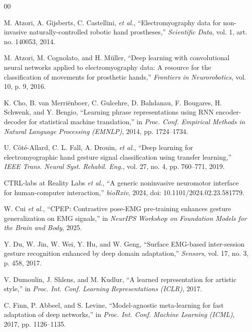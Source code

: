 \documentclass[conference]{IEEEtran}
\begin{document}
\begin{thebibliography}{00}

M. Atzori, A. Gijsberts, C. Castellini, \emph{et al.}, ``Electromyography data for non-invasive naturally-controlled robotic hand prostheses,'' \emph{Scientific Data}, vol. 1, art. no. 140053, 2014.

M. Atzori, M. Cognolato, and H. M\"uller, ``Deep learning with convolutional neural networks applied to electromyography data: A resource for the classification of movements for prosthetic hands,'' \emph{Frontiers in Neurorobotics}, vol. 10, p. 9, 2016.

K. Cho, B. van Merri\"enboer, C. Gulcehre, D. Bahdanau, F. Bougares, H. Schwenk, and Y. Bengio, ``Learning phrase representations using RNN encoder-decoder for statistical machine translation,'' in \emph{Proc. Conf. Empirical Methods in Natural Language Processing (EMNLP)}, 2014, pp. 1724--1734.

U. C\^ot\'e-Allard, C. L. Fall, A. Drouin, \emph{et al.}, ``Deep learning for electromyographic hand gesture signal classification using transfer learning,'' \emph{IEEE Trans. Neural Syst. Rehabil. Eng.}, vol. 27, no. 4, pp. 760--771, 2019.

CTRL-labs at Reality Labs \emph{et al.}, ``A generic noninvasive neuromotor interface for human-computer interaction,'' \emph{bioRxiv}, 2024, doi: 10.1101/2024.02.23.581779.

W. Cui \emph{et al.}, ``CPEP: Contrastive pose-EMG pre-training enhances gesture generalization on EMG signals,'' in \emph{NeurIPS Workshop on Foundation Models for the Brain and Body}, 2025.

Y. Du, W. Jin, W. Wei, Y. Hu, and W. Geng, ``Surface EMG-based inter-session gesture recognition enhanced by deep domain adaptation,'' \emph{Sensors}, vol. 17, no. 3, p. 458, 2017.

V. Dumoulin, J. Shlens, and M. Kudlur, ``A learned representation for artistic style,'' in \emph{Proc. Int. Conf. Learning Representations (ICLR)}, 2017.

C. Finn, P. Abbeel, and S. Levine, ``Model-agnostic meta-learning for fast adaptation of deep networks,'' in \emph{Proc. Int. Conf. Machine Learning (ICML)}, 2017, pp. 1126--1135.


\end{thebibliography}
\end{document}
